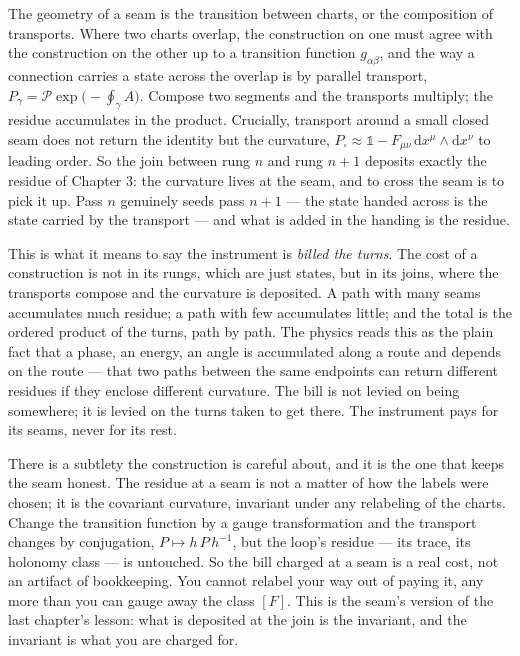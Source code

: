 The geometry of a seam is the transition between charts, or the composition of transports. Where two charts overlap, the
construction on one must agree with the construction on the other up to a transition function $g_{\alpha\beta}$, and the way
a connection carries a state across the overlap is by parallel transport, $P_\gamma = \mathcal{P}\exp\!\big(\!-\!\oint_\gamma
A\big)$. Compose two segments and the transports multiply; the residue accumulates in the product. Crucially, transport
around a small closed seam does not return the identity but the curvature, $P_{\square} \approx \mathbb{1} - F_{\mu\nu}\,
\mathrm{d}x^\mu \wedge \mathrm{d}x^\nu$ to leading order. So the join between rung $n$ and rung $n+1$ deposits exactly the
residue of Chapter 3: the curvature lives at the seam, and to cross the seam is to pick it up. Pass $n$ genuinely seeds pass
$n+1$ --- the state handed across is the state carried by the transport --- and what is added in the handing is the residue.

This is what it means to say the instrument is \emph{billed the turns}. The cost of a construction is not in its rungs, which
are just states, but in its joins, where the transports compose and the curvature is deposited. A path with many seams
accumulates much residue; a path with few accumulates little; and the total is the ordered product of the turns, path by
path. The physics reads this as the plain fact that a phase, an energy, an angle is accumulated along a route and depends on
the route --- that two paths between the same endpoints can return different residues if they enclose different curvature.
The bill is not levied on being somewhere; it is levied on the turns taken to get there. The instrument pays for its seams,
never for its rest.

There is a subtlety the construction is careful about, and it is the one that keeps the seam honest. The residue at a seam is
not a matter of how the labels were chosen; it is the covariant curvature, invariant under any relabeling of the charts.
Change the transition function by a gauge transformation and the transport changes by conjugation, $P \mapsto h\,P\,h^{-1}$,
but the loop's residue --- its trace, its holonomy class --- is untouched. So the bill charged at a seam is a real cost, not
an artifact of bookkeeping. You cannot relabel your way out of paying it, any more than you can gauge away the class $[F]$.
This is the seam's version of the last chapter's lesson: what is deposited at the join is the invariant, and the invariant is
what you are charged for.


